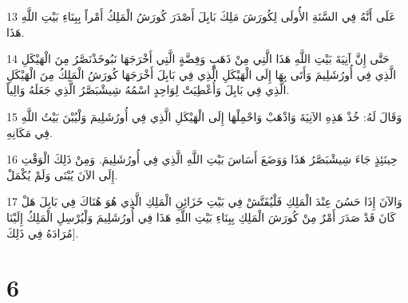 \par 13 عَلَى أَنَّهُ فِي السَّنَةِ الأُولَى لِكُورَشَ مَلِكَ بَابِلَ أَصْدَرَ كُورَشُ الْمَلِكُ أَمْراً بِبِنَاءِ بَيْتِ اللَّهِ هَذَا.
\par 14 حَتَّى إِنَّ آنِيَةَ بَيْتِ اللَّهِ هَذَا الَّتِي مِنْ ذَهَبٍ وَفِضَّةٍ الَّتِي أَخْرَجَهَا نَبُوخَذْنَصَّرُ مِنَ الْهَيْكَلِ الَّذِي فِي أُورُشَلِيمَ وَأَتَى بِهَا إِلَى الْهَيْكَلِ الَّذِي فِي بَابِلَ أَخْرَجَهَا كُورَشُ الْمَلِكُ مِنَ الْهَيْكَلِ الَّذِي فِي بَابِلَ وَأُعْطِيَتْ لِوَاحِدٍ اسْمُهُ شِيشْبَصَّرُ الَّذِي جَعَلَهُ وَالِياً.
\par 15 وَقَالَ لَهُ: خُذْ هَذِهِ الآنِيَةَ وَاذْهَبْ وَاحْمِلْهَا إِلَى الْهَيْكَلِ الَّذِي فِي أُورُشَلِيمَ وَلْيُبْنَ بَيْتُ اللَّهِ فِي مَكَانِهِ.
\par 16 حِينَئِذٍ جَاءَ شِيشْبَصَّرُ هَذَا وَوَضَعَ أَسَاسَ بَيْتِ اللَّهِ الَّذِي فِي أُورُشَلِيمَ. وَمِنْ ذَلِكَ الْوَقْتِ إِلَى الآنَ يُبْنَى وَلَمْ يُكْمَلْ.
\par 17 وَالآنَ إِذَا حَسُنَ عِنْدَ الْمَلِكِ فَلْيُفَتَّشْ فِي بَيْتِ خَزَائِنِ الْمَلِكِ الَّذِي هُوَ هُنَاكَ فِي بَابِلَ هَلْ كَانَ قَدْ صَدَرَ أَمْرٌ مِنْ كُورَشَ الْمَلِكِ بِبِنَاءِ بَيْتِ اللَّهِ هَذَا فِي أُورُشَلِيمَ وَلْيُرْسِلِ الْمَلِكُ إِلَيْنَا مُرَادَهُ فِي ذَلِكَ].

\chapter{6}

